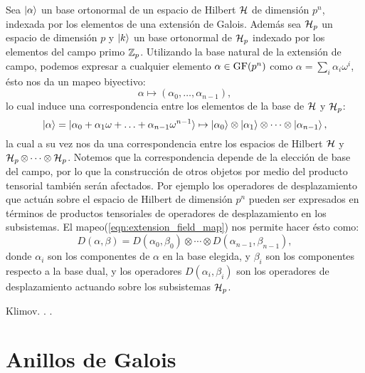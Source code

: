 Sea $\ket{\alpha}$ un base ortonormal de un espacio de
Hilbert $\operatorname{\mathcal H}$ de dimensión $p^{n}$, indexada por los
elementos de una extensión de Galois. Además sea $\operatorname{\mathcal H}_p$ un
espacio de dimensión $p$ y $\ket{k}$ un base ortonormal de
$\operatorname{\mathcal H}_p$ indexado por los elementos del campo primo $\operatorname{\mathbb{Z}}_p$.
Utilizando la base natural de la extensión de campo,
podemos expresar a cualquier elemento $\alpha \in
\operatorname{GF}(p^{n})$ como $\alpha = \sum_{i}^{} \alpha_i \omega^{i}
$, ésto nos da un mapeo biyectivo:
\begin{equation}
  \label{eqn:extension_field_map}
  \alpha \mapsto (\alpha_0,\ldots,\alpha_{n-1}),
\end{equation} 
lo cual induce una correspondencia entre los elementos de
la base de $\operatorname{\mathcal H}$ y $\operatorname{\mathcal H}_p$:
\begin{equation}
  \ket{\alpha}
  = \ket{\alpha_0 + \alpha_1 \omega + \ldots +
    \alpha_{n-1}\omega^{n-1}}
  \mapsto \ket{\alpha_0} \otimes \ket{\alpha_1} \otimes
  \cdots \otimes \ket{\alpha_{n-1}},
\end{equation}
la cual a su vez nos da una correspondencia entre los
espacios de Hilbert $\operatorname{\mathcal H}$ y $\operatorname{\mathcal H}_p \otimes \cdots \otimes
\operatorname{\mathcal H}_p$. Notemos que la correspondencia depende de la
elección de base del campo, por lo que la construcción de
otros objetos por medio del producto tensorial también
serán afectados. Por ejemplo los operadores de
desplazamiento que actuán sobre el espacio de Hilbert de
dimensión $p^{n}$ pueden ser expresados en términos de
productos tensoriales de operadores de desplazamiento en
los subsistemas. El mapeo(\ref{eqn:extension_field_map})
nos permite hacer ésto como:
\begin{equation}
  D(\alpha,\beta)
  = D(\alpha_0, \beta_0) \otimes \cdots \otimes
  D(\alpha_{n-1}, \beta_{n-1}),
\end{equation}
donde $\alpha_i$ son los componentes de $\alpha$ en la
base elegida, y $\beta_i$ son los componentes respecto a
la base dual, y los operadores $D(\alpha_i,\beta_i)$ son
los operadores de desplazamiento actuando sobre los
subsistemas $\operatorname{\mathcal H}_p$.

Klimov. . .

\section{Anillos de Galois}

